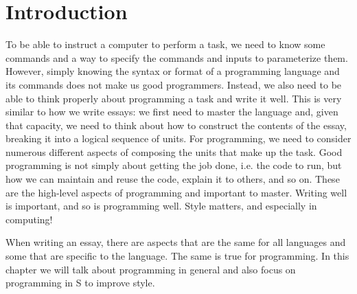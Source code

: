 \section{Introduction}

To be able to instruct a computer to perform a task, we need to know
some commands and a way to specify the commands and inputs to
parameterize them.  However, simply knowing the syntax or format of a
programming language and its commands does not make us good
programmers.  Instead, we also need to be able to think properly about
programming a task and write it well.  This is very similar to how we
write essays: we first need to master the language and, given that
capacity, we need to think about how to construct the contents of the
essay, breaking it into a logical sequence of units.
For programming, we need to consider numerous different
aspects of composing the units that make up the task.
Good programming is not simply about getting the job done,
i.e. the code to run,  but how we can maintain and reuse
the code, explain it to others, and so on.
These are the high-level aspects of programming
and important to master.  Writing well is important,
and so is programming well.  Style matters, and especially
in computing!




When writing an essay, there are aspects that are the same for all
languages and some that are specific to the language.  The same is
true for programming.  In this chapter we will talk about programming
in general and also focus on programming in S to improve style.



